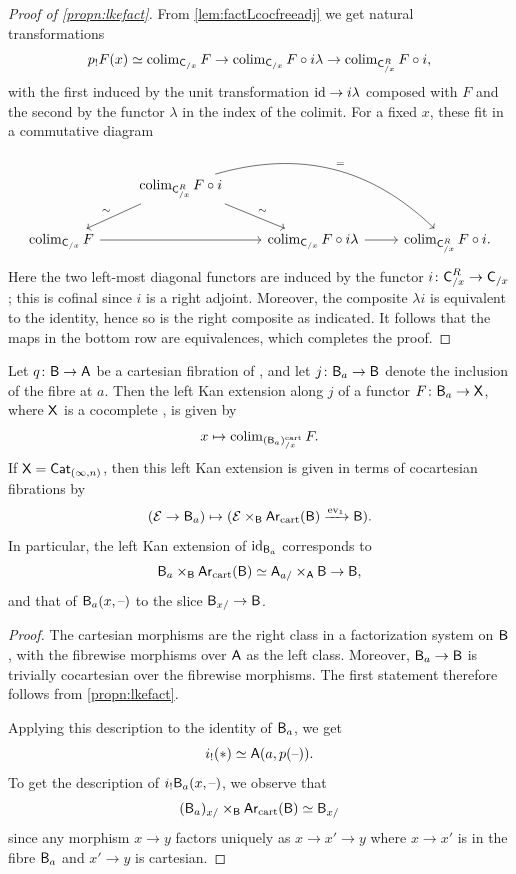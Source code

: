 \documentclass[a4paper,11pt]{article}
\begin{document}
\begin{proof}[Proof of \cref{propn:lkefact}]
  From \cref{lem:factLcocfreeadj} we get natural transformations
  \[ p_{!}F(x) \simeq \colim_{\oC_{/x}} F \to \colim_{\oC_{/x}} F
    \circ i\lambda \to \colim_{\oC_{/x}^{R}} F\circ i,\]
  with the first induced by the unit transformation $\id \to i
  \lambda$ composed with $F$ and the second by the functor
  $\lambda$ in the index of the colimit. For a fixed $x$, these fit in
  a commutative diagram
  \[
    \begin{tikzcd}
       & \colim_{\oC_{/x}^{R}} F\circ i \ar[dl, "\sim"'] \ar[dr,
       "\sim"] \ar[drr, bend left, "="] \\
      \colim_{\oC_{/x}} F \ar[rr] & &  \colim_{\oC_{/x}} F  \circ
      i\lambda \ar[r] &  \colim_{\oC_{/x}^{R}} F\circ i.
    \end{tikzcd}
  \]
  Here the two left-most diagonal functors are induced by the functor
  $i \colon \oC^{R}_{/x} \to \oC_{/x}$; this is cofinal since $i$ is a
  right adjoint. Moreover, the composite $\lambda i$ is equivalent to
  the identity, hence so is the right composite as indicated. It
  follows that the maps in the bottom row are equivalences, which
  completes the proof.
\end{proof}

\begin{cor}\label{cor:cartfibinclLKE}
  Let $q \colon \oB \to \oA$ be a cartesian fibration of \icats{}, and
  let $j \colon \oB_{a} \to \oB$ denote the inclusion of the fibre at
  $a$. Then the left Kan extension along $j$ of a functor $F \colon \oB_{a} \to
  \oX$, where $\textup{\textsf{X}}$ is a cocomplete \icat{}, is given by
  \[ x \mapsto \operatorname{colim}_{(\textup{\textsf{B}}_{a})^{\text{\textup{cart}}}_{/x}} F.\]
  If $\textup{\textsf{X}} = \textup{\textsf{Cat}}_{(\infty,n)}$, then this left Kan extension is given in terms of
  cocartesian fibrations by
  \[ (\nE \to \oB_{a}) \mapsto (\nE \times_{\oB} \Ar_{\cart}(\oB)
    \xto{\ev_{1}} \oB).\]
  In particular, the left Kan extension of $\text{\textup{id}}_{\textup{\textsf{B}}_{a}}$ corresponds
  to
  \[ \oB_{a} \times_{\oB} \Ar_{\cart}(\oB) \simeq \oA_{a/}
      \times_{\oA} \oB \to \oB,\] and that of $\textup{\textsf{B}}_{a}(x,\text{\textendash})$ to the
    slice $\oB_{x/} \to \oB$.
\end{cor}
\begin{proof}
  The cartesian morphisms are the right class in a factorization
  system on $\textup{\textsf{B}}$, with the fibrewise morphisms over $\textup{\textsf{A}}$ as the left
  class. Moreover, $\oB_{a} \to \oB$ is trivially cocartesian over the
  fibrewise morphisms. The first statement therefore follows from
  \cref{propn:lkefact}.

  Applying this description to the identity of $\textup{\textsf{B}}_{a}$, we get
  \[ i_{!}(*) \simeq \textup{\textsf{A}}(a, p(\text{\textendash})). \]
  To get the description of $i_{!}\textup{\textsf{B}}_{a}(x,\text{\textendash})$, we observe that
    \[ (\textup{\textsf{B}}_{a})_{x/} \times_{\textup{\textsf{B}}} \textup{\textsf{Ar}}_{\text{\textup{cart}}}(\textup{\textsf{B}}) \simeq \textup{\textsf{B}}_{x/}\]
    since any morphism $x \to y$ factors uniquely as $x \to x' \to y$
    where $x \to x'$ is in the fibre $\textup{\textsf{B}}_{a}$ and $x' \to y$ is
    cartesian.
\end{proof}
\end{document}
